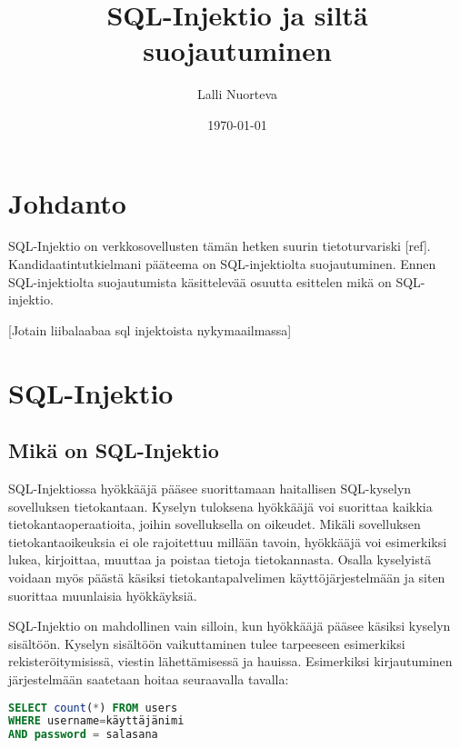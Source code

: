\documentclass[finnish]{tktltiki2}
\title{SQL-Injektio ja siltä suojautuminen}
\author{Lalli Nuorteva}
\date{\today}
\theoremstyle{definition}
\theoremstyle{remark}
\begin{document}
\frontmatter      %

\maketitle        %

\tableofcontents  %


\mainmatter       %

\section{Johdanto}
SQL-Injektio on verkkosovellusten tämän hetken suurin tietoturvariski [ref]. Kandidaatintutkielmani pääteema on SQL-injektiolta suojautuminen. Ennen SQL-injektiolta suojautumista käsittelevää osuutta esittelen mikä on SQL-injektio. 

[Jotain liibalaabaa sql injektoista nykymaailmassa]

\pagebreak

\section{SQL-Injektio}
\subsection{Mikä on SQL-Injektio}
SQL-Injektiossa hyökkääjä pääsee suorittamaan haitallisen SQL-kyselyn sovelluksen tietokantaan. Kyselyn tuloksena hyökkääjä voi suorittaa kaikkia tietokantaoperaatioita, joihin sovelluksella on oikeudet. Mikäli sovelluksen tietokantaoikeuksia ei ole rajoitettuu millään tavoin, hyökkääjä voi esimerkiksi lukea, kirjoittaa, muuttaa ja poistaa tietoja tietokannasta. Osalla kyselyistä voidaan myös päästä käsiksi tietokantapalvelimen käyttöjärjestelmään ja siten suorittaa muunlaisia hyökkäyksiä. 

SQL-Injektio on mahdollinen vain silloin, kun hyökkääjä pääsee käsiksi kyselyn sisältöön. Kyselyn sisältöön vaikuttaminen tulee tarpeeseen esimerkiksi rekisteröitymisissä, viestin lähettämisessä ja hauissa. Esimerkiksi kirjautuminen järjestelmään saatetaan hoitaa seuraavalla tavalla:


\begin{lstlisting}[language=sql]
SELECT count(*) FROM users
WHERE username=käyttäjänimi
AND password = salasana
\end{lstlisting}
\end{document}
